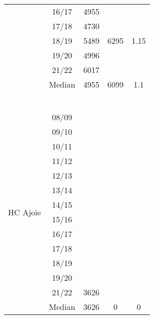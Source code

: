 \begin{longtable}[c]{p{5cm}cccc}
                                         & 16/17 & 4955 & ~ & ~ \\ 
                                         & 17/18 & 4730 & ~ & ~ \\ 
                                         & 18/19 & 5489 & 6295 & 1.15 \\ 
                                         & 19/20 & 4996 & ~ & ~ \\ 
                                         & 21/22 & 6017 & ~ & ~ \\ 
                                         \cmidrule{2-5}
                                         & Median & 4955 & 6099 & 1.1 \\ 
    \cmidrule{1-5}
     \multicolumn{5}{c}{} \\
    \multicolumn{5}{c}{} \\
    \multicolumn{5}{c}{} \\
    \multicolumn{5}{c}{} \\ 
    \multicolumn{5}{c}{} \\
    \multicolumn{5}{c}{} \\
    \multirow[t]{14}{=}{HC Ajoie} & 08/09 & ~ & ~ & ~ \\ 
                                 & 09/10 & ~ & ~ & ~ \\ 
                                 & 10/11 & ~ & ~ & ~ \\ 
                                 & 11/12 & ~ & ~ & ~ \\ 
                                 & 12/13 & ~ & ~ & ~ \\ 
                                 & 13/14 & ~ & ~ & ~ \\ 
                                 & 14/15 & ~ & ~ & ~ \\ 
                                 & 15/16 & ~ & ~ & ~ \\ 
                                 & 16/17 & ~ & ~ & ~ \\ 
                                 & 17/18 & ~ & ~ & ~ \\ 
                                 & 18/19 & ~ & ~ & ~ \\ 
                                 & 19/20 & ~ & ~ & ~ \\ 
                                 & 21/22 & 3626 & ~ & ~ \\ 
                                 \cmidrule{2-5}
                                 & Median & 3626 & 0 & 0 \\
                                 \cmidrule{1-5}

\end{longtable}
